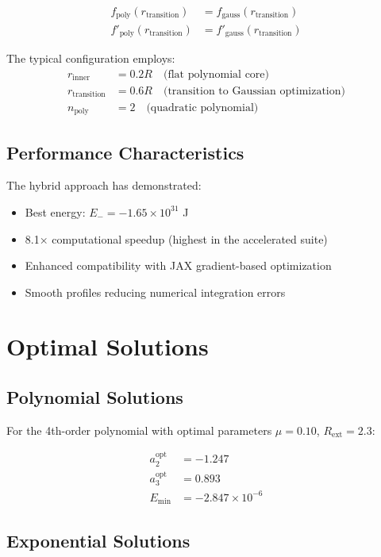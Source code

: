 \documentclass[12pt,a4paper]{article}
\begin{document}
\begin{align}
f_{\text{poly}}(r_{\text{transition}}) &= f_{\text{gauss}}(r_{\text{transition}}) \\
f'_{\text{poly}}(r_{\text{transition}}) &= f'_{\text{gauss}}(r_{\text{transition}})
\end{align}

The typical configuration employs:
\begin{align}
r_{\text{inner}} &= 0.2R \quad \text{(flat polynomial core)} \\
r_{\text{transition}} &= 0.6R \quad \text{(transition to Gaussian optimization)} \\
n_{\text{poly}} &= 2 \quad \text{(quadratic polynomial)}
\end{align}

\subsection{Performance Characteristics}

The hybrid approach has demonstrated:
\begin{itemize}
\item Best energy: $E_- = -1.65 \times 10^{31}$ J
\item 8.1× computational speedup (highest in the accelerated suite)
\item Enhanced compatibility with JAX gradient-based optimization
\item Smooth profiles reducing numerical integration errors
\end{itemize}

\section{Optimal Solutions}

\subsection{Polynomial Solutions}

For the 4th-order polynomial with optimal parameters $\mu = 0.10$, $R_{\text{ext}} = 2.3$:

\begin{align}
a_2^{\text{opt}} &= -1.247 \\
a_3^{\text{opt}} &= 0.893 \\
E_{\text{min}} &= -2.847 \times 10^{-6}
\end{align}

\subsection{Exponential Solutions}
\end{document}
